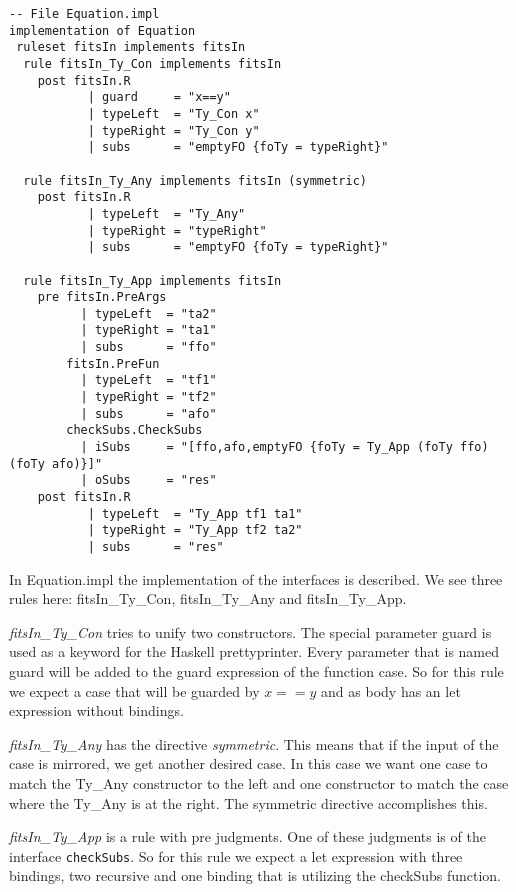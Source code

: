\documentclass[10pt]{article}
\begin{document}
\begin{verbatim}
-- File Equation.impl
implementation of Equation
 ruleset fitsIn implements fitsIn
  rule fitsIn_Ty_Con implements fitsIn
    post fitsIn.R
           | guard     = "x==y"
           | typeLeft  = "Ty_Con x"
           | typeRight = "Ty_Con y"
           | subs      = "emptyFO {foTy = typeRight}"

  rule fitsIn_Ty_Any implements fitsIn (symmetric)
    post fitsIn.R
           | typeLeft  = "Ty_Any"
           | typeRight = "typeRight"
           | subs      = "emptyFO {foTy = typeRight}"

  rule fitsIn_Ty_App implements fitsIn
    pre fitsIn.PreArgs
          | typeLeft  = "ta2"
          | typeRight = "ta1"
          | subs      = "ffo"
        fitsIn.PreFun
          | typeLeft  = "tf1"
          | typeRight = "tf2"
          | subs      = "afo" 
        checkSubs.CheckSubs
          | iSubs     = "[ffo,afo,emptyFO {foTy = Ty_App (foTy ffo) (foTy afo)}]"
          | oSubs     = "res"
    post fitsIn.R
           | typeLeft  = "Ty_App tf1 ta1"
           | typeRight = "Ty_App tf2 ta2"
           | subs      = "res"
\end{verbatim}

In Equation.impl the implementation of the interfaces is described. We see three rules here: fitsIn\_Ty\_Con, fitsIn\_Ty\_Any and fitsIn\_Ty\_App.

\emph{fitsIn\_Ty\_Con} tries to unify two constructors. The special parameter guard is used as a keyword for the Haskell prettyprinter. Every parameter that is named guard will be added to the guard expression of the function case. So for this rule we expect a case that will be guarded by $x == y$ and as body has an let expression without bindings.

\emph{fitsIn\_Ty\_Any} has the directive \emph{symmetric}. This means that if the input of the case is mirrored, we get another desired case. In this case we want one case to match the Ty\_Any constructor to the left and one constructor to match the case where the Ty\_Any is at the right. The symmetric directive accomplishes this.

\emph{fitsIn\_Ty\_App} is a rule with pre judgments. One of these judgments is of the interface \texttt{checkSubs}. So for this rule we expect a let expression with three bindings, two recursive and one binding that is utilizing the checkSubs function.
\end{document}
